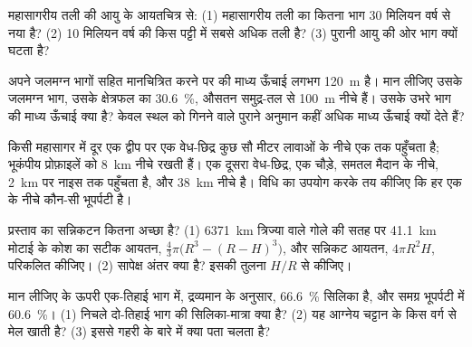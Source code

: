 \begin{exercise}[$\star\star$]\label{exo:g12:continental-crust:9}
महासागरीय तली की आयु के आयतचित्र से: (1) महासागरीय तली का कितना भाग
30 मिलियन वर्ष से नया है? (2) 10 मिलियन वर्ष की किस पट्टी में
सबसे अधिक तली है? (3) पुरानी आयु की ओर भाग क्यों घटता है?
\end{exercise}

\begin{exercise}[$\star\star$]\label{exo:g12:continental-crust:10}
अपने जलमग्न भागों सहित मानचित्रित करने पर  की माध्य ऊँचाई
लगभग \qty{120}{m} है। मान लीजिए उसके जलमग्न भाग, उसके क्षेत्रफल का \qty{30.6}{\percent},
औसतन समुद्र-तल से \qty{100}{m} नीचे हैं। उसके उभरे भाग की माध्य ऊँचाई
क्या है? केवल स्थल को गिनने वाले पुराने अनुमान
कहीं अधिक माध्य ऊँचाई क्यों देते हैं?
\end{exercise}

\begin{exercise}[$\star\star$]\label{exo:g12:continental-crust:11}
किसी महासागर में दूर एक द्वीप पर एक वेध-छिद्र कुछ सौ
मीटर लावाओं के नीचे एक  तक पहुँचता है; भूकंपीय प्रोफ़ाइलें  को \qty{8}{km} नीचे रखती हैं।
एक दूसरा वेध-छिद्र, एक चौड़े, समतल मैदान के नीचे, \qty{2}{km} पर नाइस तक पहुँचता है,
और  \qty{38}{km} नीचे है। विधि का उपयोग करके तय कीजिए कि हर एक के नीचे कौन-सी
भूपर्पटी है।
\end{exercise}

\begin{exercise}[$\star\star\star$]\label{exo:g12:continental-crust:12}
प्रस्ताव का सन्निकटन कितना अच्छा है? (1) \qty{6371}{km} त्रिज्या वाले
गोले की सतह पर \qty{41.1}{km} मोटाई के कोश का सटीक आयतन,
$\tfrac{4}{3}\pi\bigl(R^3 - (R - H)^3\bigr)$, और
सन्निकट आयतन, $4\pi R^2 H$, परिकलित कीजिए। (2) सापेक्ष अंतर क्या है? इसकी तुलना
$H/R$ से कीजिए।
\end{exercise}

\begin{exercise}[$\star\star\star$]\label{exo:g12:continental-crust:13}
मान लीजिए  के ऊपरी एक-तिहाई भाग में, द्रव्यमान के अनुसार,
\qty{66.6}{\percent} सिलिका है, और समग्र भूपर्पटी में \qty{60.6}{\percent}। (1)
निचले दो-तिहाई भाग की सिलिका-मात्रा क्या है? (2) यह आग्नेय चट्टान के किस वर्ग से
मेल खाती है? (3) इससे गहरी  के बारे में क्या
पता चलता है?
\end{exercise}

